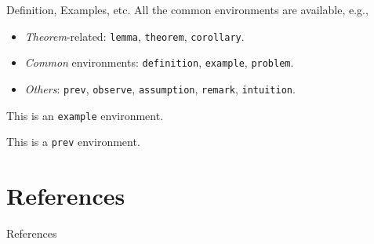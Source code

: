 \documentclass[aspectratio=169, xcolor={dvipsnames}, hyperref={colorlinks=true,linkcolor=Dandelion,urlcolor=magenta,citecolor=violet, hyperfootnotes=true}]{beamer}
\begin{document}
\begin{frame}{Definition, Examples, etc.}
    All the common environments are available, e.g.,
    \begin{itemize}
        \item \emph{Theorem}-related: \texttt{lemma}, \texttt{theorem}, \texttt{corollary}.
        \item \emph{Common} environments: \texttt{definition}, \texttt{example}, \texttt{problem}.
        \item \emph{Others}: \texttt{prev}, \texttt{observe}, \texttt{assumption}, \texttt{remark}, \texttt{intuition}.
    \end{itemize}

    \begin{example}[A demonstration]
        This is an \texttt{example} environment.
    \end{example}

    \begin{prev}
        This is a \texttt{prev} environment.
    \end{prev}
\end{frame}

\section{References}

\begin{frame}{References}
    \printbibliography
\end{frame}
\end{document}
